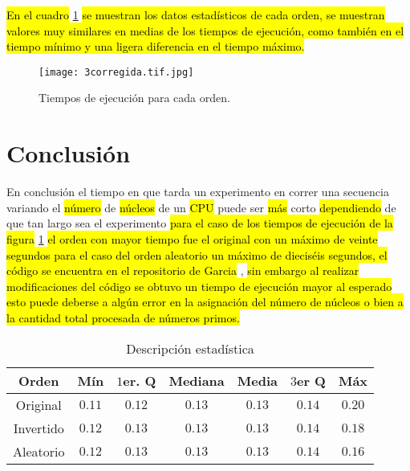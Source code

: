 \documentclass[10pt,a4paper]{article}
\begin{document}
\begin{multicols}{2}
	\hl{En el cuadro} \ref{tb: Tabla1} \hl{se muestran los datos estad\'isticos de cada orden, se muestran valores muy similares en medias de los tiempos de ejecuci\'on, como tambi\'en en el tiempo m\'inimo  y una ligera diferencia en el tiempo m\'aximo.}

	
\begin{figure}[H]
				\centering
				\texttt{[image: 3corregida.tif.jpg]} 
				\caption{Tiempos de ejecución para cada orden.}
				\label{fig2}
\end{figure}


		\section{Conclusión}
		En conclusión el tiempo en que tarda un experimento en correr una secuencia variando el \hl{n\'umero} de \hl{n\'ucleos} de un \hl{CPU} puede ser \hl{m\'as} corto \hl{dependiendo} de que tan largo sea el experimento \hl{para el caso de los tiempos de ejecuci\'on de la figura} \ref{fig2} \hl{el orden con mayor tiempo fue el original con un m\'aximo de veinte segundos para el caso del orden aleatorio un m\'aximo de diecis\'eis segundos, el c\'odigo se encuentra en el repositorio de Garcia} \cite{gitadrian}, \hl{sin embargo al realizar modificaciones del c\'odigo se obtuvo un tiempo de ejecuci\'on mayor al esperado esto puede deberse a alg\'un error en la asignaci\'on del n\'umero de n\'ucleos o bien a la cantidad total procesada de n\'umeros primos.}
\end{multicols}
	\begin{table}[ht]
		\centering
		\caption{Descripción estadística}
		\begin{tabular}{|c|c|c|c|c|c|c|}
			\hline
			 Orden & Mín & $1$er. Q & Mediana & Media & $3$er Q & Máx \\
			\hline
			Original & $0.11$ & $0.12$ & $0.13$ & $0.13$ & $0.14$ & $0.20$ \\
			\hline
			Invertido& $0.12$ & $0.13$ & $0.13$ & $0.13$ & $0.14$ & $0.18$\\
			\hline
			Aleatorio & $0.12$ & $0.13$ & $0.13$ & $0.13$ & $0.14$ & $0.16$\\
			\hline
		\end{tabular}
	\label{tb: Tabla1}
	\end{table}
	
	\begin{multicols}{2}


	\end{multicols}

	
\end{document}

